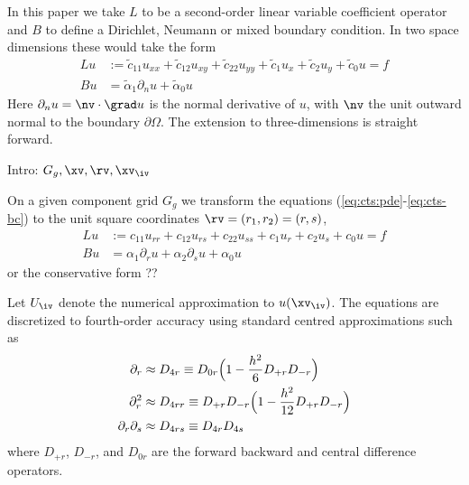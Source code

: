 \documentclass[12pt]{article}
\begin{document}
\newcommand{\ct}{\tilde{c}}
\newcommand{\alphat}{\tilde{\alpha}}
In this paper we take $L$ to be a second-order linear variable coefficient operator
and $B$ to define a Dirichlet, Neumann or mixed boundary condition. In two space dimensions these would
take the form
\begin{align}
   L u &:= \ct_{11} u_{xx} + \ct_{12} u_{xy} + \ct_{22} u_{yy} 
                     + \ct_1 u_x + \ct_2 u_y + \ct_0 u = f \label{eq:cts-pde} \\
   Bu &= \alphat_1 \partial_n u + \alphat_0 u             \label{eq:cts-bc}
\end{align}
Here $\partial_n u=\nv\cdot\grad u$ is the normal derivative of $u$, with $\nv$ the unit outward
normal to the boundary $\partial\Omega$. The extension to three-dimensions is straight forward.


Intro: $G_g, \xv,\rv, \xv_\iv$

On a given component grid $G_g$ we transform the equations (\ref{eq:cts:pde}-\ref{eq:cts-bc})
to the unit square coordinates $\rv=(r_1,r_2)=(r,s)$,
\begin{align}
    L u &:= c_{11} u_{rr} + c_{12} u_{rs} + c_{22} u_{ss} 
                     + c_1 u_r + c_2 u_s + c_0 u = f \label{eq:cts-pde} \\
   Bu &= \alpha_1 \partial_r u + \alpha_2 \partial_s u + \alpha_0 u             \label{eq:cts-bc-r}
\end{align}
or the conservative form ??

Let $U_\iv$ denote the numerical approximation to $u(\xv_\iv)$.
The equations are discretized to fourth-order accuracy using standard
centred approximations such as
\begin{align} 
  \partial_r &\approx D_{4r} \equiv D_{0r}\Big( 1 - {h^2\over6} D_{+r}D_{-r}\Big) \\
  \partial_r^2 &\approx D_{4rr} \equiv D_{+r}D_{-r}\Big( 1 - {h^2\over12} D_{+r}D_{-r}\Big) \\
  \partial_r\partial_s &\approx D_{4rs} \equiv D_{4r}D_{4s}
\end{align}
where $D_{+r}$, $D_{-r}$, and $D_{0r}$ are the forward backward and central difference operators.
\end{document}
